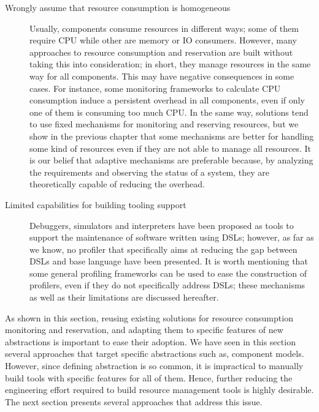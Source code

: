 \begin{description}
\item[Wrongly assume that resource consumption is homogeneous]
Usually, components consume resources in different ways; some of them require CPU while other are memory or IO consumers.
However, many approaches to resource consumption and reservation are built without taking this into consideration; in short, they manage resources in the same way for all components.
This may have negative consequences in some cases.
For instance, some monitoring frameworks to calculate CPU consumption induce a persistent overhead in all components, even if only one of them is consuming too much CPU.
In the same way, solutions tend to use fixed mechanisms for monitoring and reserving resources, but we show in the previous chapter that some mechanisms are better for handling some kind of resources even if they are not able to manage all resources. 
It is our belief that adaptive mechanisms are preferable because, by analyzing the requirements and observing the status of a system, they are theoretically capable of reducing the overhead.

\item[Limited capabilities for building tooling support] Debuggers, simulators and interpreters have been proposed as tools to support the maintenance of software written using DSLs; however, as far as we know, no profiler that specifically aims at reducing the gap between DSLs and base language have been presented.
It is worth mentioning that some general profiling frameworks can be used to ease the construction of profilers, even if they do not specifically address DSLs; these mechanisms as well as their limitations are discussed hereafter.

\end{description}

As shown in this section, reusing existing solutions for resource consumption monitoring and reservation, and adapting them to specific features of new abstractions is important to ease their adoption.
We have seen in this section several approaches that target specific abstractions such as, component models.
However, since defining abstraction is so common, it is impractical to manually build tools with specific features for all of them.
Hence, further reducing the engineering effort required to build resource management tools is highly desirable.
The next section presents several approaches that address this issue.

